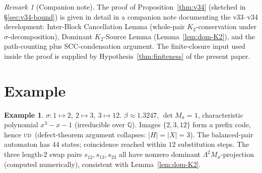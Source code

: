 \documentclass[11pt]{article}
\theoremstyle{plain}
\theoremstyle{definition}
\newtheorem{example}[theorem]{Example}
\theoremstyle{remark}
\newtheorem{remark}[theorem]{Remark}
\newcommand{\UD}{\textsc{ud}}
\newcommand{\Q}{\mathbb{Q}}
\begin{document}
\begin{remark}[Companion note]\label{sec:companion}
The proof of Proposition~\ref{thm:v34} (sketched in \S\ref{sec:v34-bound}) is given in detail in a companion note documenting the v33--v34 development: Inter-Block Cancellation Lemma (whole-pair $K_2$-conservation under $\sigma$-decomposition), Dominant $K_2$-Source Lemma (Lemma~\ref{lem:dom-K2}), and the path-counting plus SCC-condensation argument. The finite-closure input used inside the proof is supplied by Hypothesis~\ref{thm:finiteness} of the present paper.
\end{remark}

\section{Example}\label{sec:example}

\begin{example}\label{ex:plastic}
$\sigma:1\mapsto 2,\ 2\mapsto 3,\ 3\mapsto 12$. $\beta\approx 1.3247$, $\det M_\sigma=1$, characteristic polynomial $x^3-x-1$ (irreducible over $\Q$). Images $\{2,3,12\}$ form a prefix code, hence \UD\ (defect-theorem argument collapses: $|H|=|X|=3$). The balanced-pair automaton has $44$ states; coincidence reached within $12$ substitution steps. The three length-$2$ swap pairs $s_{12}, s_{13}, s_{23}$ all have nonzero dominant $\Lambda^2 M_\sigma$-projection (computed numerically), consistent with Lemma~\ref{lem:dom-K2}.
\end{example}
\end{document}
